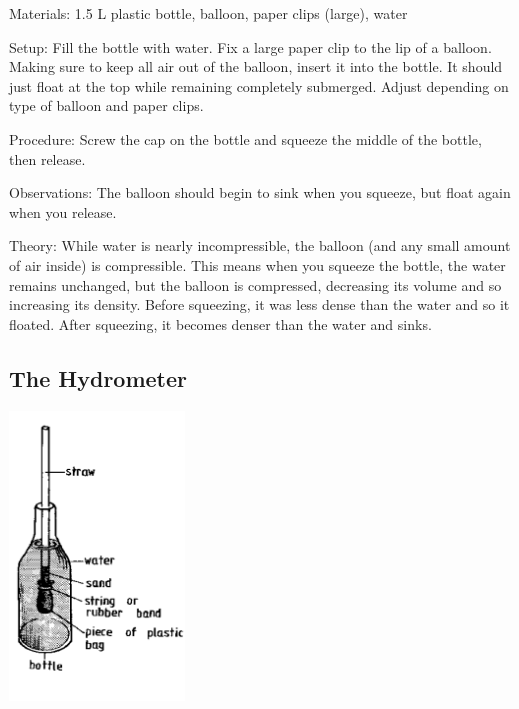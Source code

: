 \begin{multicols}{2}
\begin{description*}
\item[Materials:]{1.5 L plastic bottle, balloon, paper clips (large), water}
\item[Setup:]{Fill the bottle with water. Fix a large paper clip to the lip of a balloon. Making sure to keep all air out of the balloon, insert it into the bottle. It should just float at the top while remaining completely submerged. Adjust depending on type of balloon and paper clips.}
\item[Procedure:]{Screw the cap on the bottle and squeeze the middle of the bottle, then release.}
\item[Observations:]{The balloon should begin to sink when you squeeze, but float again when you release.}
\item[Theory:]{While water is nearly incompressible, the balloon (and any small amount of air inside) is compressible. This means when you squeeze the bottle, the water remains unchanged, but the balloon is compressed, decreasing its volume and so increasing its density. Before squeezing, it was less dense than the water and so it floated. After squeezing, it becomes denser than the water and sinks.}
\end{description*}

\subsection{The Hydrometer} 

\begin{center}
\includegraphics[width=0.35\textwidth]{./img/source/hydrometer.png}
\end{center}


\end{multicols}
